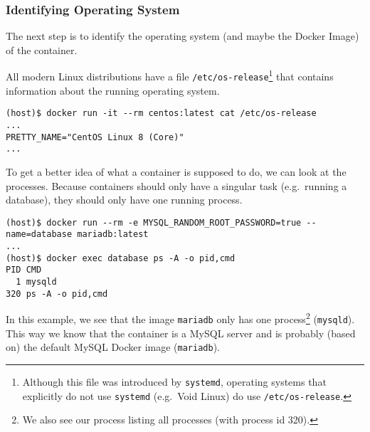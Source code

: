 \subsubsection{Identifying Operating System}\label{subsubsection:idenitfy-container-os}
The next step is to identify the operating system (and maybe the Docker Image) of the container.

All modern Linux distributions have a file \lstinline{/etc/os-release}\footnote{Although this file was introduced by \lstinline{systemd}, operating systems that explicitly do not use \lstinline{systemd} (e.g.\ Void Linux) do use \lstinline{/etc/os-release}.} that contains information about the running operating system.
\begin{lstlisting}[caption={CentOS container \lstinline{/etc/os-release}.},captionpos=b]
(host)$ docker run -it --rm centos:latest cat /etc/os-release
...
PRETTY_NAME="CentOS Linux 8 (Core)"
...
\end{lstlisting}

To get a better idea of what a container is supposed to do, we can look at the processes. Because containers should only have a singular task (e.g.\ running a database), they should only have one running process.

\begin{lstlisting}[caption={A container only has one process.},captionpos=b]
(host)$ docker run --rm -e MYSQL_RANDOM_ROOT_PASSWORD=true --name=database mariadb:latest
...
(host)$ docker exec database ps -A -o pid,cmd
PID CMD
  1 mysqld
320 ps -A -o pid,cmd
\end{lstlisting}

In this example, we see that the image \lstinline{mariadb} only has one process\footnote{We also see our process listing all processes (with process id 320).} (\lstinline{mysqld}). This way we know that the container is a MySQL server and is probably (based on) the default MySQL Docker image (\lstinline{mariadb}).
